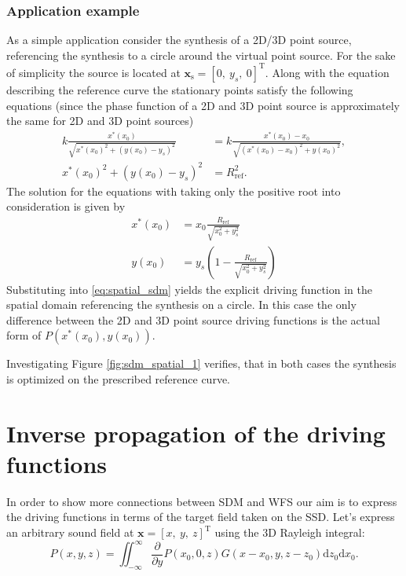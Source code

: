 \documentclass[12pt,a4paper]{article}
\newcommand{\td}{\mathrm{d}}
\newcommand{\vx}{\mathbf{x}}
\newcommand{\vxs}{\mathbf{x}_{\mathrm{s}}}
\begin{document}
\subsubsection{Application example}
As a simple application consider the synthesis of a 2D/3D point source, referencing the synthesis to a circle around the virtual point source. For the sake of simplicity the source is located at $\vxs = [0,\ y_s,\ 0]^{\mathrm{T}}$. Along with the equation describing the reference curve the stationary points satisfy the following equations (since the phase function of a 2D and 3D point source is approximately the same for 2D and 3D point sources)
\begin{align}
k \frac{x^*(x_0)}{\sqrt{x^*(x_0)^2 + (y(x_0)-y_s)^2}} &= k \frac{x^*(x_0)-x_0}{\sqrt{(x^*(x_0)-x_0)^2 + y(x_0)^2}}, \\
x^*(x_0)^2 + (y(x_0)-y_s)^2     &= R_{\mathrm{ref}}^2.
\end{align}
The solution for the equations with taking only the positive root into consideration is given by
\begin{align}
x^*(x_0) &= x_0 \frac{ R_{\mathrm{ref}}}{\sqrt{x_0^2 + y_s^2}} \\
y(x_0) 	 &= y_s \left( 1 -  \frac{R_{\mathrm{ref}}}{\sqrt{x_0^2 + y_s^2}}\right)
\end{align}
Substituting into \eqref{eq:spatial_sdm} yields the explicit driving function in the spatial domain referencing the synthesis on a circle. In this case the only difference between the 2D and 3D point source driving functions is the actual form of $P(x^*(x_0),y(x_0))$.

Investigating Figure \ref{fig:sdm_spatial_1} verifies, that in both cases the synthesis is optimized on the prescribed reference curve.

\section{Inverse propagation of the driving functions}

In order to show more connections between SDM and WFS our aim is to express the driving functions in terms of the target field taken on the SSD.
Let's express an arbitrary sound field at $\vx = [x,\ y,\ z]^{\mathrm{T}}$ using the 3D Rayleigh integral:
\begin{equation}
P(x,y,z) = \iint_{-\infty}^{\infty} \frac{\partial}{\partial y}P(x_0,0,z) G(x-x_0,y,z-z_0) \td z_0 \td x_0.
\end{equation}
\end{document}
